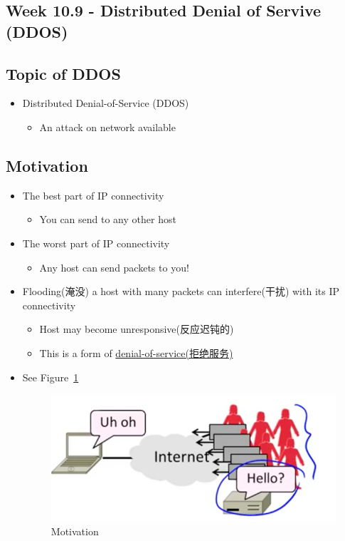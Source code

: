 \documentclass[12pt]{ctexart}   %
\begin{document}
\subsection{Week 10.9 - Distributed Denial of Servive (DDOS)}
	\subsection{Topic of DDOS}
	\begin{itemize}
		\item Distributed Denial-of-Service (DDOS)
		\begin{itemize}
			\item An attack on network available
		\end{itemize}
	\end{itemize}

	\subsection{Motivation}
	\begin{itemize}
		\item The best part of IP connectivity
		\begin{itemize}
			\item You can send to any other host
		\end{itemize}

		\item The worst part of IP connectivity
		\begin{itemize}
			\item Any host can send packets to you!
		\end{itemize}

		\item Flooding(淹没) a host with many packets can interfere(干扰) with its IP connectivity
		\begin{itemize}
			\item Host may become unresponsive(反应迟钝的)
			\item This is a form of \underline{denial-of-service(拒绝服务)}
		\end{itemize}
		\item See Figure~\ref{fig:10-9-1}
		  
		\begin{figure}[h!] %
		\centering
		\includegraphics[scale=0.7]{images/10-9-1}
		\caption{Motivation}
		\label{fig:10-9-1}
		\end{figure}
	\end{itemize}
\end{document}
